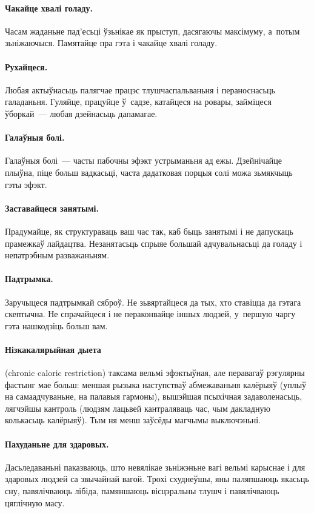 \paragraph{Чакайце хвалі голаду.}
Часам жаданьне пад'есьці ўзьнікае як прыступ, дасягаючы максімуму, а~потым зьніжаючыся. Памятайце пра гэта і чакайце хвалі голаду.

\paragraph{Рухайцеся.}
Любая актыўнасьць палягчае працэс тлушчаспальваньня і пераноснасьць галаданьня. Гуляйце, працуйце ў~садзе, катайцеся на ровары, займіцеся ўборкай~--- любая дзейнасьць дапамагае.

\paragraph{Галаўныя болі.}
Галаўныя болі~--- часты пабочны эфэкт устрыманьня ад ежы. Дзейнічайце плыўна, піце больш вадкасьці, часта дадатковая порцыя солі можа зьмякчыць гэты эфэкт.

\paragraph{Заставайцеся занятымі.}
Прадумайце, як структураваць ваш час так, каб быць занятымі і не дапускаць прамежкаў лайдацтва. Незанятасьць спрыяе большай адчувальнасьці да голаду і непатрэбным разважаньням.

\paragraph{Падтрымка.}
Заручыцеся падтрымкай сяброў. Не зьвяртайцеся да тых, хто ставіцца да гэтага скептычна. Не спрачайцеся і не пераконвайце іншых людзей, у~першую чаргу гэта нашкодзіць больш вам.

\paragraph{Нізкакалярыйная дыета} (chronic caloric restriction) таксама вельмі эфэктыўная, але перавагаў рэгулярны фастынг мае больш: меншая рызыка наступстваў абмежаваньня калёрыяў (уплыў на самаадчуваньне, на палавыя гармоны), вышэйшая псыхічная задаволенасьць, лягчэйшы кантроль (людзям лацьвей кантраляваць час, чым дакладную колькасьць калёрыяў). Тым ня менш заўсёды магчымы выключэньні.

\paragraph{Пахуданьне для здаровых.}
Дасьледаваньні паказваюць, што невялікае зьніжэньне вагі вельмі карыснае і для здаровых людзей са звычайнай вагой. Трохі схуднеўшы, яны паляпшаюць якасьць сну, павялічваюць лібіда, памяншаюць вісцэральны тлушч і павялічваюць цяглічную масу.

